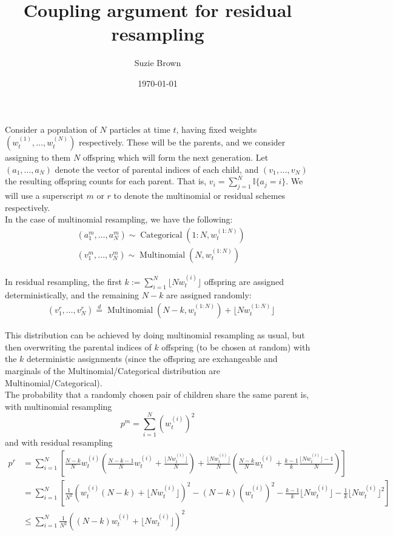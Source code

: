 \documentclass[fleqn]{article}
\title{Coupling argument for residual resampling}
\author{Suzie Brown}
\date{\today}
\newcommand{\eqdist}{\overset{d}{=}}
\newcommand{\I}[1]{\mathbb{I}\{#1\}}
\newcommand{\Mn}{\operatorname{Multinomial}}
\newcommand{\Cat}{\operatorname{Categorical}}
\newcommand{\wt}[2][t]{w_{#1}^{(#2)}}
\begin{document}
\maketitle
\thispagestyle{fancy}

Consider a population of $N$ particles at time $t$, having fixed weights $(\wt{1},\dots, \wt{N})$ respectively. These will be the parents, and we consider assigning to them $N$ offspring which will form the next generation. 
Let $(a_1, \dots, a_N)$ denote the vector of parental indices of each child, and $(v_1, \dots, v_N)$ the resulting offspring counts for each parent. That is, $v_i = \sum_{j=1}^N \I{a_j = i} $. We will use a superscript $m$ or $r$ to denote the multinomial or residual schemes respectively.\\

In the case of multinomial resampling, we have the following:
\begin{align*}
& (a_1^m, \dots, a_N^m) \sim \Cat(1:N, \wt{1:N}) \\
& (v_1^m, \dots, v_N^m) \sim \Mn(N, \wt{1:N})
\end{align*}

In residual resampling, the first $k := \sum_{i=1}^N \lfloor N\wt{i} \rfloor$ offspring are assigned deterministically, and the remaining $N-k$ are assigned randomly:
\begin{align*}
& (v_1^r, \dots, v_N^r) \eqdist \Mn(N-k, \wt{1:N}) + \lfloor N \wt{1:N} \rfloor
\end{align*}

This distribution can be achieved by doing multinomial resampling as usual, but then overwriting the parental indices of $k$ offspring (to be chosen at random) with the $k$ deterministic assignments (since the offspring are exchangeable and marginals of the Multinomial/Categorical distribution are Multinomial/Categorical).\\

The probability that a randomly chosen pair of children share the same parent is, with multinomial resampling
\begin{equation*}
p^m = \sum_{i=1}^N (\wt{i})^2
\end{equation*}
and with residual resampling
\begin{align*}
p^r &= \sum_{i=1}^N  \left[ \frac{N-k}{N} \wt{i} \left( \frac{N-k-1}{N} \wt{i} + \frac{\lfloor N\wt{i}\rfloor}{N}\right) + \frac{\lfloor N\wt{i}\rfloor}{N} \left(\frac{N-k}{N} \wt{i} + \frac{k-1}{k} \frac{\lfloor N\wt{i}\rfloor -1}{N} \right) \right] \\
&= \sum_{i=1}^N \left[ \frac{1}{N^2} \left( \wt{i} (N-k) + \lfloor N\wt{i}\rfloor \right)^2 - (N-k) (\wt{i})^2 - \frac{k-1}{k} \lfloor N\wt{i}\rfloor - \frac{1}{k}  \lfloor N\wt{i}\rfloor^2 \right] \\
&\leq \sum_{i=1}^N \frac{1}{N^2} \left( (N-k) \wt{i} + \lfloor N\wt{i}\rfloor \right)^2
\end{align*}


\end{document}
